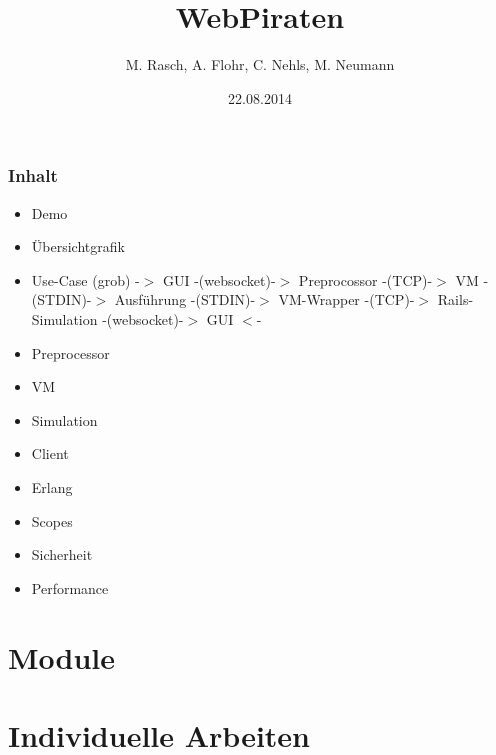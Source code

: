 \documentclass{beamer}
\begin{document}

\title{WebPiraten}  
\author{M. Rasch, A. Flohr, C. Nehls, M. Neumann}
\date{22.08.2014} 

\begin{frame}
\maketitle
\end{frame} 

\begin{frame}
\frametitle{Inhalt}
\tableofcontents
	[pausesections]
\end{frame}

\begin{frame}
\begin{itemize}
\item Demo
\item Übersichtgrafik
\item Use-Case (grob)\newline
-$>$ GUI -(websocket)-$>$ Preprocossor -(TCP)-$>$ VM -(STDIN)-$>$ Ausführung -(STDIN)-$>$ VM-Wrapper -(TCP)-$>$ Rails-Simulation -(websocket)-$>$ GUI $<$-
\item Preprocessor
\item VM
\item Simulation
\item Client
\item Erlang
\item Scopes
\item Sicherheit
\item Performance
\end{itemize}
\end{frame}

\section{Module}






\section{Individuelle Arbeiten}




\end{document}
